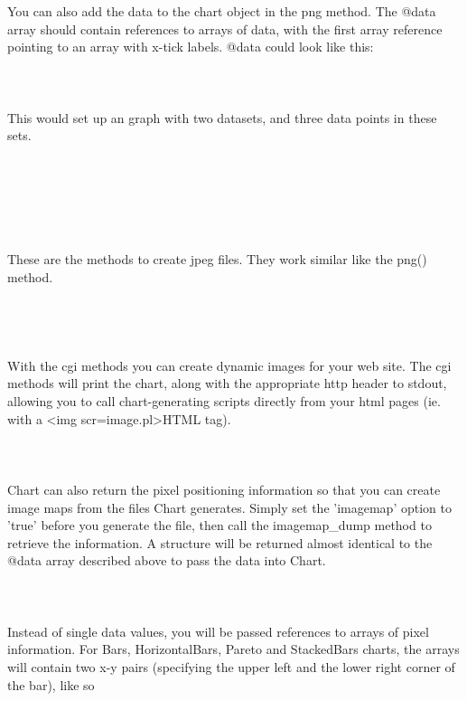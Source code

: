 You can also add the data to the chart object in the png method. The @data array should contain references to arrays of data, with the first array reference pointing to an array with x-tick labels. @data could look like this:\\
\\
\\
\\
This would set up an graph with two datasets, and three data points in these sets.\\
\\
\\
 \\
 \\
 \\
\\
These are the methods to create jpeg files. They work similar like the png() method. \\
\\
\\
 \\
 \\
With the cgi methods you can create dynamic images for your web site. The cgi methods will print the chart, along with the appropriate http header to stdout, allowing you to call chart-generating scripts directly from your html pages (ie. with a <img scr=image.pl>HTML tag).\\
\\
\\
 \\ 
Chart can also return the pixel positioning information so that you can create image maps from the files Chart generates. Simply set the 'imagemap' option to 'true' before you generate the file, then call the imagemap\_dump method to retrieve the information. A structure will be returned almost identical to the @data array described above to pass the data into Chart.\\
\\
\\
\\
Instead of single data values, you will be passed references to arrays of pixel information. For Bars, HorizontalBars, Pareto and StackedBars charts, the arrays will contain two x-y pairs (specifying the upper left and the lower right corner of the bar), like so\\
